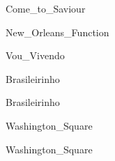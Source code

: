 \documentclass{scrartcl}
\begin{document}

{Come_to_Saviour}


{New_Orleans_Function}


{Vou_Vivendo}


{Brasileirinho}


{Brasileirinho}


{Washington_Square}


{Washington_Square}
\end{document}
